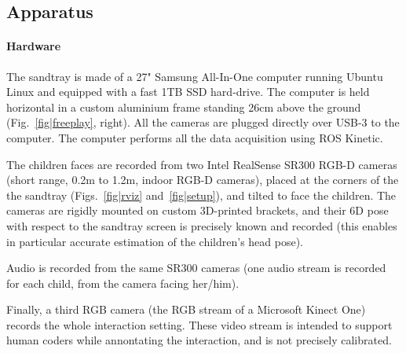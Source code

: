 \documentclass{article}
\begin{document}
\subsection{Apparatus}

\paragraph{Hardware}
The sandtray is made of a 27" Samsung All-In-One computer running Ubuntu Linux
and equipped with a fast 1TB SSD hard-drive. The computer is held horizontal in
a custom aluminium frame standing 26cm above the ground
(Fig.~\ref{fig|freeplay}, right). All the cameras are plugged directly over
USB-3 to the computer. The computer performs all the data acquisition using ROS
Kinetic.

The children faces are recorded from two Intel RealSense SR300 RGB-D cameras
(short range, 0.2m to 1.2m, indoor RGB-D cameras), placed at the corners of the
the sandtray (Figs.~\ref{fig|rviz} and~\ref{fig|setup}), and tilted to face the
children. The cameras are rigidly mounted on custom 3D-printed brackets, and
their 6D pose with respect to the sandtray screen is precisely known and
recorded (this enables in particular accurate estimation of the children's head
pose).

Audio is recorded from the same SR300 cameras (one audio stream is recorded for
each child, from the camera facing her/him).

Finally, a third RGB camera (the RGB stream of a Microsoft Kinect One) records
the whole interaction setting. These video stream is intended to support human
coders while annontating the interaction, and is not precisely calibrated.
\end{document}
